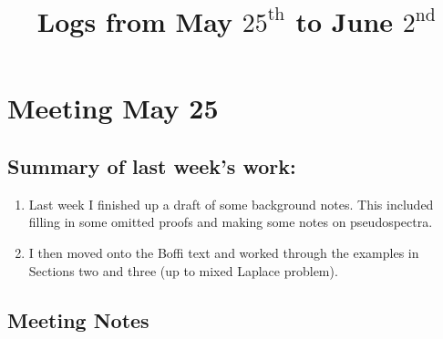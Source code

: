 \documentclass[12pt,a4paper]{article}
\title{Logs from May $25^{\text{th}}$ to June $2^{\text{nd}}$}
\author{}
\date{}
\begin{document}
\maketitle

\section{Meeting May 25}

\subsection{Summary of last week's work:}




\begin{enumerate}
    \item Last week I finished up a draft of some background notes. This included filling in some omitted proofs and making some notes on pseudospectra.
    \item I then moved onto the Boffi text and worked through the examples in Sections two and three (up to mixed Laplace problem).
\end{enumerate}



\subsection{Meeting Notes}
\end{document}
